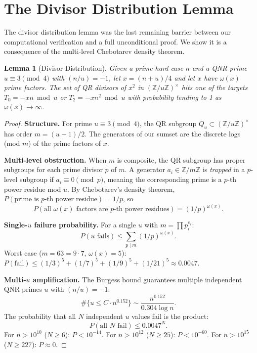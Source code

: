 \documentclass[11pt,a4paper]{article}
\theoremstyle{plain}
\newtheorem{lemma}[theorem]{Lemma}
\theoremstyle{plain}
\theoremstyle{definition}
\numberwithin{equation}{section}
\begin{document}
\section{The Divisor Distribution Lemma}

The divisor distribution lemma was the last remaining barrier between our computational verification and a full unconditional proof. We show it is a consequence of the multi-level Chebotarev density theorem.

\begin{lemma}[Divisor Distribution]\label{lem:divisor-dist}
Given a prime hard case $n$ and a QNR prime $u \equiv 3 \pmod{4}$ with $(n/u) = -1$, let $x = (n+u)/4$ and let $x$ have $\omega(x)$ prime factors. The set of QR divisors of $x^2$ in $(\mathbb{Z}/u\mathbb{Z})^\times$ hits one of the targets $T_0 = -xn \bmod u$ or $T_2 = -xn^2 \bmod u$ with probability tending to 1 as $\omega(x) \to \infty$.
\end{lemma}

\begin{proof}
\textbf{Structure.} For prime $u \equiv 3 \pmod{4}$, the QR subgroup $Q_u \subset (\mathbb{Z}/u\mathbb{Z})^\times$ has order $m = (u-1)/2$. The generators of our sumset are the discrete logs (mod $m$) of the prime factors of $x$.

\textbf{Multi-level obstruction.} When $m$ is composite, the QR subgroup has proper subgroups for each prime divisor $p$ of $m$. A generator $a_i \in \mathbb{Z}/m\mathbb{Z}$ is \emph{trapped} in a $p$-level subgroup if $a_i \equiv 0 \pmod{p}$, meaning the corresponding prime is a $p$-th power residue mod $u$. By Chebotarev's density theorem, $P(\text{prime is $p$-th power residue}) = 1/p$, so
\begin{equation}
P(\text{all } \omega(x) \text{ factors are $p$-th power residues}) = (1/p)^{\omega(x)}.
\end{equation}

\textbf{Single-$u$ failure probability.} For a single $u$ with $m = \prod p_i^{e_i}$:
\begin{equation}
P(u \text{ fails}) \leq \sum_{p \mid m} (1/p)^{\omega(x)}.
\end{equation}
Worst case ($m = 63 = 9 \cdot 7$, $\omega(x) = 5$): $P(\text{fail}) \leq (1/3)^5 + (1/7)^5 + (1/9)^5 + (1/21)^5 \approx 0.0047$.

\textbf{Multi-$u$ amplification.} The Burgess bound guarantees multiple independent QNR primes $u$ with $(n/u) = -1$:
\begin{equation}
\#\{u \leq C \cdot n^{0.152}\} \sim \frac{n^{0.152}}{0.304 \log n}.
\end{equation}
The probability that all $N$ independent $u$ values fail is the product:
\begin{equation}
P(\text{all } N \text{ fail}) \leq 0.0047^N.
\end{equation}
For $n > 10^{10}$ ($N \geq 6$): $P < 10^{-14}$. For $n > 10^{12}$ ($N \geq 25$): $P < 10^{-60}$. For $n > 10^{15}$ ($N \geq 227$): $P \approx 0$.
\end{proof}
\end{document}
